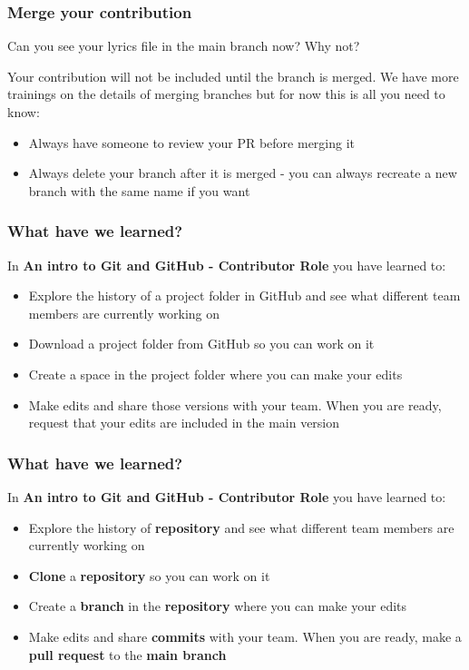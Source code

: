 \documentclass[aspectratio=169]{beamer} %
\begin{document}
\begin{frame}
\frametitle{Merge your contribution}

Can you see your lyrics file in the main branch now? Why not?

\vspace{.5cm}

Your contribution will not be included until the branch is merged. We have more trainings on the details of merging branches but for now this is all you need to know:

	\begin{itemize}
		\item Always have someone to review your PR before merging it
		\item Always delete your branch after it is merged - you can always recreate a new branch with the same name if you want
	\end{itemize}

\end{frame}



\begin{frame}
\frametitle{What have we learned?}

	In \textbf{An intro to Git and GitHub - Contributor Role} you have learned to:

	\begin{itemize}
		\item Explore the history of a project folder in GitHub and see what different team members are currently working on
		\item Download a project folder from GitHub so you can work on it
		\item Create a space in the project folder where you can make your edits
		\item Make edits and share those versions with your team. When you are ready, request that your edits are included in the main version
	\end{itemize}

\end{frame}

\begin{frame}
\frametitle{What have we learned?}

	In \textbf{An intro to Git and GitHub - Contributor Role} you have learned to:

	\begin{itemize}
		\item Explore the history of \textbf{repository} and see what different team members are currently working on
		\item \textbf{Clone} a \textbf{repository} so you can work on it
		\item Create a \textbf{branch} in the \textbf{repository} where you can make your edits
		\item Make edits and share \textbf{commits} with your team. When you are ready, make a \textbf{pull request} to the \textbf{main branch}
	\end{itemize}
\end{frame}
\end{document}
